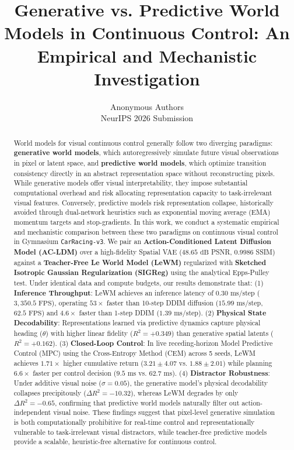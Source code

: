 \documentclass{article}
\title{Generative vs. Predictive World Models in Continuous Control: An Empirical and Mechanistic Investigation}
\author{
  Anonymous Authors \\
  NeurIPS 2026 Submission
}
\begin{document}
\maketitle

\begin{abstract}
World models for visual continuous control generally follow two diverging paradigms: \textbf{generative world models}, which autoregressively simulate future visual observations in pixel or latent space, and \textbf{predictive world models}, which optimize transition consistency directly in an abstract representation space without reconstructing pixels. While generative models offer visual interpretability, they impose substantial computational overhead and risk allocating representation capacity to task-irrelevant visual features. Conversely, predictive models risk representation collapse, historically avoided through dual-network heuristics such as exponential moving average (EMA) momentum targets and stop-gradients. In this work, we conduct a systematic empirical and mechanistic comparison between these two paradigms on continuous visual control in Gymnasium \texttt{CarRacing-v3}. We pair an \textbf{Action-Conditioned Latent Diffusion Model (AC-LDM)} over a high-fidelity Spatial VAE ($48.65\text{ dB}$ PSNR, $0.9986$ SSIM) against a \textbf{Teacher-Free Le World Model (LeWM)} regularized with \textbf{Sketched Isotropic Gaussian Regularization (SIGReg)} using the analytical Epps-Pulley test. Under identical data and compute budgets, our results demonstrate that:
(1) \textbf{Inference Throughput}: LeWM achieves an inference latency of $0.30\text{ ms/step}$ ($3,350.5\text{ FPS}$), operating $53\times$ faster than 10-step DDIM diffusion ($15.99\text{ ms/step}$, $62.5\text{ FPS}$) and $4.6\times$ faster than 1-step DDIM ($1.39\text{ ms/step}$).
(2) \textbf{Physical State Decodability}: Representations learned via predictive dynamics capture physical heading ($\theta$) with higher linear fidelity ($R^2 = +0.349$) than generative spatial latents ($R^2 = +0.162$).
(3) \textbf{Closed-Loop Control}: In live receding-horizon Model Predictive Control (MPC) using the Cross-Entropy Method (CEM) across 5 seeds, LeWM achieves $1.71\times$ higher cumulative return ($3.21 \pm 4.07$ vs. $1.88 \pm 2.01$) while planning $6.6\times$ faster per control decision ($9.5\text{ ms}$ vs. $62.7\text{ ms}$).
(4) \textbf{Distractor Robustness}: Under additive visual noise ($\sigma = 0.05$), the generative model's physical decodability collapses precipitously ($\Delta R^2 = -10.32$), whereas LeWM degrades by only $\Delta R^2 = -0.65$, confirming that predictive world models naturally filter out action-independent visual noise.
These findings suggest that pixel-level generative simulation is both computationally prohibitive for real-time control and representationally vulnerable to task-irrelevant visual distractors, while teacher-free predictive models provide a scalable, heuristic-free alternative for continuous control.
\end{abstract}
\end{document}
